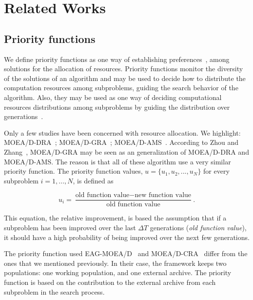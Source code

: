 \section{Related Works}

\subsection{Priority functions}

We define priority functions as one way of establishing preferences~\cite{chankong1983multiobjective},\cite{hansson2005decision} among solutions for the allocation of resources. Priority functions monitor the diversity of the solutions of an algorithm and may be used to decide how to distribute the computation resources among subproblems, guiding the search behavior of the algorithm. Also, they may be used as one way of deciding computational resources distributions among subproblems by guiding the distribution over generations~\cite{cai2015external}. 

Only a few studies have been concerned with resource allocation. We highlight: MOEA/D-DRA~\cite{zhang2009performance}; MOEA/D-GRA~\cite{zhou2016all};  MOEA/D-AMS~\cite{chiang2011moea}. According to Zhou and Zhang~\cite{zhou2016all}, MOEA/D-GRA may be seen as an generalization of MOEA/D-DRA and MOEA/D-AMS. The reason is that all of these algorithm use a very similar priority function. The priority function values, $u = \{u_1, u_2, ..., u_N\}$ for every subproblem $i=1,...,N$, is  defined as

\begin{equation}\label{priority}
	u_i = \dfrac{\text{old function value}-\text{new function value}}{\text{old function value}}.
\end{equation}


This equation, the relative improvement, is based the assumption that if a subproblem has been improved over the last $\Delta T$ generations (\textit{old function value}), it should have a high probability of being improved over the next few generations. 
	
The priority function used EAG-MOEA/D~\cite{cai2015external} and MOEA/D-CRA~\cite{kang2018collaborative} differ from the ones that we mentioned previously. In their case, the framework keeps two populations: one working population, and one external archive. The priority function is based on the contribution to the external archive from each subproblem in the search process. 


